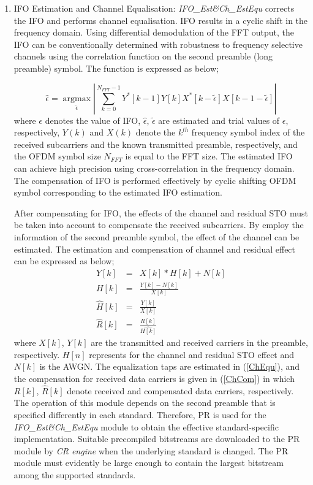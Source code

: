 \begin{enumerate}
\item{IFO Estimation and Channel Equalisation:}
\emph{IFO\_Est\&Ch\_EstEqu} corrects the IFO and performs channel equalisation. 
IFO results in a cyclic shift in the frequency domain. 
Using differential demodulation of the FFT output, the IFO can be conventionally determined with robustness to frequency selective channels using the correlation function \cite{Park2002} on the second preamble (long preamble) symbol.
The function is expressed as below;

\begin{equation}
\label{integerCFO}
\hat{\epsilon} =\underset{\tilde{\epsilon}}{\operatorname{argmax}}  \left|\sum_{k=0}^{N_{FFT}-1} Y^{*}[k-1] Y[k]  X^{*}[k-\tilde{\epsilon}]  X[k-1-\tilde{\epsilon}]\right|
\end{equation}
where $\epsilon$ denotes the value of IFO, $\hat{\epsilon}$, $\tilde{\epsilon}$ are estimated and trial values of $\epsilon$, respectively,
$Y(k)$ and $X(k)$ denote the $k^{th}$ frequency symbol index of the received subcarriers and the known transmitted preamble, respectively, and the OFDM symbol size $N_{FFT}$ is equal to the FFT size.
The estimated IFO can achieve high precision using cross-correlation in the frequency domain.
The compensation of IFO is performed effectively by cyclic shifting OFDM symbol corresponding to the estimated IFO estimation.

After compensating for IFO, the effects of the channel and residual STO must be taken into account to compensate the received subcarriers.
By employ the information of the second preamble symbol, the effect of the channel can be estimated. 
The estimation and compensation of channel and residual effect can be expressed as below;
\begin{eqnarray}
\label{ChEqu}
Y[k] &=& X[k] * H[k] + N[k] \nonumber \\
H[k] &=& \frac{Y[k]-N[k]}{X[k]} \nonumber \\
\hat{H}[k] &=& \frac{Y[k]}{X[k]}\\
\label{ChCom}
\hat{R}[k] &=& \frac{R[k]}{\hat{H[k]}}
\end{eqnarray}
where $X[k]$, $Y[k]$ are the transmitted and received carriers in the preamble, respectively. 
$H[n]$ represents for the channel and residual STO effect and $N[k]$ is the AWGN.
The equalization taps are estimated in (\ref{ChEqu}), and the compensation for received data carriers is given in (\ref{ChCom}) 
in which $R[k]$, $\hat{R}[k]$ denote received and compensated data carriers, respectively.
The operation of this module depends on the second preamble that is specified differently in each standard.
Therefore, PR is used for the \emph{IFO\_Est\&Ch\_EstEqu} module to obtain the effective standard-specific implementation.
Suitable precompiled bitstreams are downloaded to the PR module by \emph{CR engine} when the underlying standard is changed.
The PR module must evidently be large enough to contain the largest bitstream among the supported standards.


\end{enumerate}

